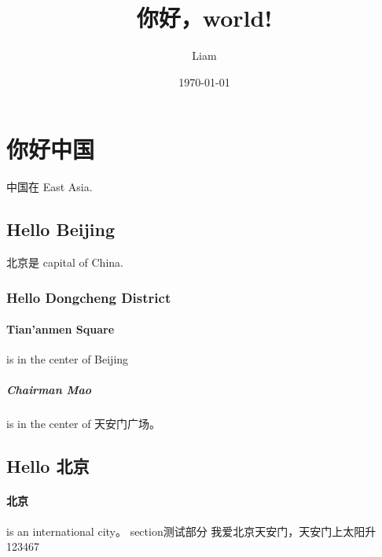 \documentclass[UTF8]{ctexart}
\title{你好，world!}
\author{Liam}
\date{\today}
\begin{document}
\maketitle
\section{你好中国}
中国在 East Asia.

\subsection{Hello Beijing}
北京是 capital of China.

\subsubsection{Hello Dongcheng District}

\paragraph{Tian'anmen Square}
is in the center of Beijing

\subparagraph{Chairman Mao}
is in the center of 天安门广场。

\subsection{Hello 北京}

\paragraph{北京} is an international city。
section{测试部分}
我爱北京天安门，天安门上太阳升123467
\end{document}
